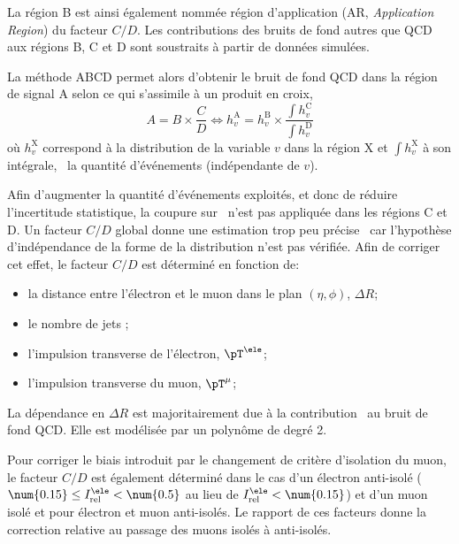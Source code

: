 La région B est ainsi également nommée région d'application (AR, \emph{Application Region}) du facteur $C/D$.
Les contributions des bruits de fond autres que QCD aux régions B, C et D sont soustraits à partir de données simulées.
\par
La méthode ABCD permet alors d'obtenir le bruit de fond QCD dans la région de signal A selon ce qui s'assimile à un produit en croix,
\begin{equation}
A = B \times \frac{C}{D} \Leftrightarrow h_v^\text{A} = h_v^\text{B} \times \frac{\int h_v^\text{C}}{\int h_v^\text{D}}
\end{equation}
où $h_v^\text{X}$ correspond à la distribution de la variable $v$ dans la région X et $\int h_v^\text{X}$ à son intégrale, \ie\ la quantité d'événements (indépendante de $v$).
\par
Afin d'augmenter la quantité d'événements exploités, et donc de réduire l'incertitude statistique, la coupure sur \Dzeta\ n'est pas appliquée dans les régions C et D.
Un facteur $C/D$ global donne une estimation trop peu précise~\cite{CMS-PAS-HIG-18-032} car l'hypothèse d'indépendance de la forme de la distribution n'est pas vérifiée.
Afin de corriger cet effet, le facteur $C/D$ est déterminé en fonction de:
\begin{itemize}
\item la distance entre l'électron et le muon dans le plan $(\eta,\phi)$, $\Delta R$;
\item le nombre de jets \Njets;
\item l'impulsion transverse de l'électron, $\pT^{\ele}$;
\item l'impulsion transverse du muon, $\pT^{\mu}$;
\end{itemize}
La dépendance en $\Delta R$ est majoritairement due à la contribution \quarkb\antiquarkb\ au bruit de fond QCD.
Elle est modélisée par un polynôme de degré 2.
\par
Pour corriger le biais introduit par le changement de critère d'isolation du muon, le facteur $C/D$ est également déterminé dans le cas d'un électron anti-isolé ($\num{0.15}\leq I_\text{rel}^{\ele} < \num{0.5}$ au lieu de $I_\text{rel}^{\ele} < \num{0.15}$) et d'un muon isolé et pour électron et muon anti-isolés.
Le rapport de ces facteurs donne la correction relative au passage des muons isolés à anti-isolés.